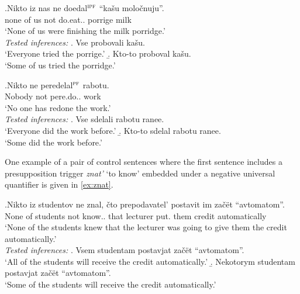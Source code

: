 \exg.\label{ex:kasha}Nikto iz nas ne doedal$^{\textsc{ipf}}$ ``ka\v{s}u molo\v{c}nuju''.\\
none of us not do.eat.. porrige milk\\
\trans `None of us were finishing the milk porridge.'\smallskip\\
\textit{Tested inferences:}
\a. Vse probovali ka\v{s}u.\\
`Everyone tried the porrige.'
\b. Kto-to proboval ka\v{s}u.\\
`Some of us tried the porridge.'


\exg.\label{ex:homework}Nikto ne peredelal$^{\textsc{pf}}$ rabotu.\\
Nobody not pere.do.. work\\
\trans `No one has redone the work.'\smallskip\\
\textit{Tested inferences:}
\a. \label{test:homework1}Vse sdelali rabotu ranee.\\
`Everyone did the work before.'
\b. \label{test:homework2}Kto-to sdelal rabotu ranee.\\
`Some did the work before.'


One example of a pair of control sentences where the first sentence includes a presupposition trigger \textit{znat'} `to know' embedded under a negative universal quantifier is given in \ref{ex:znat}.

\exg.\label{ex:znat}Nikto iz studentov ne znal, \v{c}to prepodavatel' postavit im za\v{c}\"{e}t ``avtomatom''.\\
None of students not know.. that lecturer put. them credit automatically\\
\trans `None of the students knew that the lecturer was going to give them the credit automatically.'\smallskip\\
\textit{Tested inferences:}
\a. Vsem studentam postavjat za\v{c}\"et ``avtomatom''.\\
 `All of the students will receive the credit automatically.'
\b. Nekotorym studentam postavjat za\v{c}\"et ``avtomatom''.\\
 `Some of the students will receive the credit automatically.'

